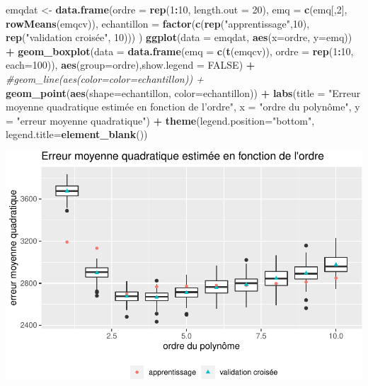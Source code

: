 \documentclass[
]{book}
\newenvironment{Shaded}{\begin{snugshade}}{\end{snugshade}}
\newcommand{\CommentTok}[1]{\textcolor[rgb]{0.56,0.35,0.01}{\textit{#1}}}
\newcommand{\DataTypeTok}[1]{\textcolor[rgb]{0.13,0.29,0.53}{#1}}
\newcommand{\DecValTok}[1]{\textcolor[rgb]{0.00,0.00,0.81}{#1}}
\newcommand{\KeywordTok}[1]{\textcolor[rgb]{0.13,0.29,0.53}{\textbf{#1}}}
\newcommand{\NormalTok}[1]{#1}
\newcommand{\OperatorTok}[1]{\textcolor[rgb]{0.81,0.36,0.00}{\textbf{#1}}}
\newcommand{\OtherTok}[1]{\textcolor[rgb]{0.56,0.35,0.01}{#1}}
\newcommand{\StringTok}[1]{\textcolor[rgb]{0.31,0.60,0.02}{#1}}
\theoremstyle{definition}
\theoremstyle{definition}
\theoremstyle{definition}
\theoremstyle{remark}
\begin{document}
\begin{Shaded}
\begin{Highlighting}[]
\NormalTok{emqdat <-}\StringTok{ }\KeywordTok{data.frame}\NormalTok{(}\DataTypeTok{ordre =} \KeywordTok{rep}\NormalTok{(}\DecValTok{1}\OperatorTok{:}\DecValTok{10}\NormalTok{, }\DataTypeTok{length.out =} \DecValTok{20}\NormalTok{), }
           \DataTypeTok{emq =} \KeywordTok{c}\NormalTok{(emq[,}\DecValTok{2}\NormalTok{], }\KeywordTok{rowMeans}\NormalTok{(emqcv)),}
           \DataTypeTok{echantillon =} \KeywordTok{factor}\NormalTok{(}\KeywordTok{c}\NormalTok{(}\KeywordTok{rep}\NormalTok{(}\StringTok{"apprentissage"}\NormalTok{,}\DecValTok{10}\NormalTok{), }\KeywordTok{rep}\NormalTok{(}\StringTok{"validation croisée"}\NormalTok{, }\DecValTok{10}\NormalTok{)))}
\NormalTok{)}
\KeywordTok{ggplot}\NormalTok{(}\DataTypeTok{data =}\NormalTok{ emqdat, }\KeywordTok{aes}\NormalTok{(}\DataTypeTok{x=}\NormalTok{ordre, }\DataTypeTok{y=}\NormalTok{emq)) }\OperatorTok{+}
\StringTok{  }\KeywordTok{geom_boxplot}\NormalTok{(}\DataTypeTok{data =} \KeywordTok{data.frame}\NormalTok{(}\DataTypeTok{emq =} \KeywordTok{c}\NormalTok{(}\KeywordTok{t}\NormalTok{(emqcv)), }
                                 \DataTypeTok{ordre =} \KeywordTok{rep}\NormalTok{(}\DecValTok{1}\OperatorTok{:}\DecValTok{10}\NormalTok{, }\DataTypeTok{each=}\DecValTok{100}\NormalTok{)), }\KeywordTok{aes}\NormalTok{(}\DataTypeTok{group=}\NormalTok{ordre),}\DataTypeTok{show.legend =} \OtherTok{FALSE}\NormalTok{) }\OperatorTok{+}
\StringTok{  }\CommentTok{#geom_line(aes(color=color=echantillon)) + }
\StringTok{  }\KeywordTok{geom_point}\NormalTok{(}\KeywordTok{aes}\NormalTok{(}\DataTypeTok{shape=}\NormalTok{echantillon, }\DataTypeTok{color=}\NormalTok{echantillon)) }\OperatorTok{+}\StringTok{ }
\StringTok{  }\KeywordTok{labs}\NormalTok{(}\DataTypeTok{title =} \StringTok{"Erreur moyenne quadratique estimée en fonction de l'ordre"}\NormalTok{, }
     \DataTypeTok{x =} \StringTok{"ordre du polynôme"}\NormalTok{, }
     \DataTypeTok{y =} \StringTok{"erreur moyenne quadratique"}\NormalTok{) }\OperatorTok{+}\StringTok{ }
\StringTok{  }\KeywordTok{theme}\NormalTok{(}\DataTypeTok{legend.position=}\StringTok{"bottom"}\NormalTok{,}
        \DataTypeTok{legend.title=}\KeywordTok{element_blank}\NormalTok{())}
\end{Highlighting}
\end{Shaded}

\begin{center}\includegraphics{MATH60602_files/figure-latex/plotcv-1} \end{center}

\backmatter
  
\end{document}
